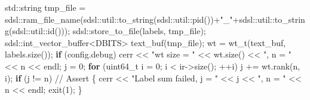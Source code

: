 \documentclass[
]{article}
\newenvironment{Shaded}{\begin{snugshade}}{\end{snugshade}}
\newcommand{\CommentTok}[1]{\textcolor[rgb]{0.48,0.49,0.49}{#1}}
\newcommand{\ControlFlowTok}[1]{\textcolor[rgb]{0.99,0.74,0.29}{\textbf{#1}}}
\newcommand{\DataTypeTok}[1]{\textcolor[rgb]{0.16,0.50,0.73}{#1}}
\newcommand{\DecValTok}[1]{\textcolor[rgb]{0.96,0.45,0.00}{#1}}
\newcommand{\NormalTok}[1]{\textcolor[rgb]{0.81,0.81,0.76}{#1}}
\newcommand{\OperatorTok}[1]{\textcolor[rgb]{0.81,0.81,0.76}{#1}}
\newcommand{\StringTok}[1]{\textcolor[rgb]{0.96,0.31,0.31}{#1}}
\begin{document}
\begin{Shaded}
\begin{Highlighting}[]
\NormalTok{    std}\OperatorTok{::}\NormalTok{string tmp\_file }\OperatorTok{=}\NormalTok{ sdsl}\OperatorTok{::}\NormalTok{ram\_file\_name}\OperatorTok{(}\NormalTok{sdsl}\OperatorTok{::}\NormalTok{util}\OperatorTok{::}\NormalTok{to\_string}\OperatorTok{(}\NormalTok{sdsl}\OperatorTok{::}\NormalTok{util}\OperatorTok{::}\NormalTok{pid}\OperatorTok{())+}\StringTok{"\_"}\OperatorTok{+}\NormalTok{sdsl}\OperatorTok{::}\NormalTok{util}\OperatorTok{::}\NormalTok{to\_string}\OperatorTok{(}\NormalTok{sdsl}\OperatorTok{::}\NormalTok{util}\OperatorTok{::}\NormalTok{id}\OperatorTok{()));}
\NormalTok{    sdsl}\OperatorTok{::}\NormalTok{store\_to\_file}\OperatorTok{(}\NormalTok{labels}\OperatorTok{,}\NormalTok{ tmp\_file}\OperatorTok{);}
\NormalTok{    sdsl}\OperatorTok{::}\NormalTok{int\_vector\_buffer}\OperatorTok{\textless{}}\NormalTok{DBITS}\OperatorTok{\textgreater{}}\NormalTok{ text\_buf}\OperatorTok{(}\NormalTok{tmp\_file}\OperatorTok{);}
\NormalTok{    wt }\OperatorTok{=}\NormalTok{ wt\_t}\OperatorTok{(}\NormalTok{text\_buf}\OperatorTok{,}\NormalTok{ labels}\OperatorTok{.}\NormalTok{size}\OperatorTok{());}
    \ControlFlowTok{if} \OperatorTok{(}\NormalTok{config}\OperatorTok{.}\NormalTok{debug}\OperatorTok{)}
\NormalTok{        cerr }\OperatorTok{\textless{}\textless{}} \StringTok{"wt size = "} \OperatorTok{\textless{}\textless{}}\NormalTok{ wt}\OperatorTok{.}\NormalTok{size}\OperatorTok{()} \OperatorTok{\textless{}\textless{}} \StringTok{", n = "} \OperatorTok{\textless{}\textless{}}\NormalTok{ n }\OperatorTok{\textless{}\textless{}}\NormalTok{ endl}\OperatorTok{;}
\NormalTok{    j }\OperatorTok{=} \DecValTok{0}\OperatorTok{;}
    \ControlFlowTok{for} \OperatorTok{(}\DataTypeTok{uint64\_t}\NormalTok{ i }\OperatorTok{=} \DecValTok{0}\OperatorTok{;}\NormalTok{ i }\OperatorTok{\textless{}}\NormalTok{ ir}\OperatorTok{{-}\textgreater{}}\NormalTok{size}\OperatorTok{();} \OperatorTok{++}\NormalTok{i}\OperatorTok{)}
\NormalTok{        j }\OperatorTok{+=}\NormalTok{ wt}\OperatorTok{.}\NormalTok{rank}\OperatorTok{(}\NormalTok{n}\OperatorTok{,}\NormalTok{ i}\OperatorTok{);}
    \ControlFlowTok{if} \OperatorTok{(}\NormalTok{j }\OperatorTok{!=}\NormalTok{ n}\OperatorTok{)} \CommentTok{// Assert}
    \OperatorTok{\{}
\NormalTok{        cerr }\OperatorTok{\textless{}\textless{}} \StringTok{"Label sum failed, j = "} \OperatorTok{\textless{}\textless{}}\NormalTok{ j }\OperatorTok{\textless{}\textless{}} \StringTok{", n = "} \OperatorTok{\textless{}\textless{}}\NormalTok{ n }\OperatorTok{\textless{}\textless{}}\NormalTok{ endl}\OperatorTok{;}
\NormalTok{        exit}\OperatorTok{(}\DecValTok{1}\OperatorTok{);}
    \OperatorTok{\}}
    

\end{Highlighting}
\end{Shaded}
\end{document}
